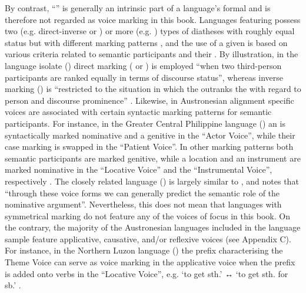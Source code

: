 By contrast, “” \citep[120ff.]{zuniga:kittila:2019} is generally an intrinsic part of a language’s formal  and is therefore not regarded as voice marking in this book. Languages featuring  possess two (e.g. direct-inverse or ) or more (e.g. ) types of diatheses with roughly equal status but with different marking patterns \citep[7]{arka:ross:2005}, and the use of a given  is based on various  criteria related to semantic participants and their . By illustration, in the language isolate  () direct marking ( or ) is employed “when two third-person participants are ranked equally in terms of discourse status”, whereas inverse marking () is “restricted to the situation in which the  outranks the  with regard to person and discourse prominence” \citep[265]{haude:2012}. Likewise, in Austronesian alignment specific voices are associated with certain syntactic marking patterns for semantic participants. For instance, in the Greater Central Philippine language  () an  is syntactically marked nominative and a  genitive in the “Actor Voice”, while their case marking is swapped in the “Patient Voice”. In other marking patterns both semantic participants are marked genitive, while a location and an instrument are marked nominative in the “Locative Voice” and the “Instrumental Voice”, respectively \citep[125ff.]{zuniga:kittila:2019}. The closely related language  () is largely similar to , and \cite[40]{tanangkingsing:2009} notes that “through these voice forms we can generally predict the semantic role of the nominative argument”. Nevertheless, this does not mean that languages with symmetrical marking do not feature any of the voices of focus in this book. On the contrary, the majority of the Austronesian languages included in the language sample feature applicative, causative, and/or reflexive voices (see Appendix C). For instance, in the Northern Luzon language  () the prefix  characterising the  Theme Voice can serve as voice marking in the applicative voice when the prefix is added onto verbs in the  “Locative Voice”, e.g.  ‘to get sth.’ ↔  ‘to get sth. for sb.’ \citep[157ff., 161ff.]{robinson:l:2011}.

